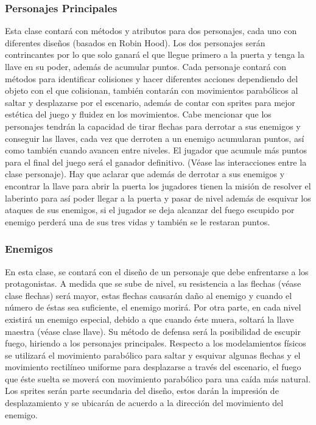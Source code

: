 \documentclass{article}
\begin{document}
\subsubsection{Personajes Principales}

Esta clase contará con métodos y atributos para dos personajes, cada uno con diferentes diseños (basados en Robin Hood). Los dos personajes serán contrincantes por lo que solo ganará el que llegue primero a la puerta y tenga la llave en su poder, además de acumular puntos. Cada personaje contará con métodos para identificar colisiones y hacer diferentes acciones dependiendo del objeto con el que colisionan, también contarán con movimientos parabólicos al saltar y desplazarse por el escenario, además de contar con sprites para mejor estética del juego y fluidez en los movimientos. Cabe mencionar que los personajes tendrán la capacidad de tirar flechas para derrotar a sus enemigos y conseguir las llaves, cada vez que derroten a un enemigo acumularan puntos, así como también cuando avancen entre niveles. El jugador que acumule más puntos para el final del juego será el ganador definitivo. (Véase las interacciones entre la clase personaje). Hay que aclarar que además de derrotar a sus enemigos y encontrar la llave para abrir la puerta los jugadores tienen la misión de resolver el laberinto para así poder llegar a la puerta y pasar de nivel además de esquivar los ataques de sus enemigos, si el jugador se deja alcanzar del fuego escupido por enemigo perderá una de sus tres vidas y también se le restaran puntos.

\subsubsection{Enemigos}

 En esta clase, se contará con el diseño de un personaje que debe enfrentarse a los protagonistas. A medida que se sube de nivel, su resistencia a las flechas (véase clase flechas) será mayor, estas flechas causarán daño al enemigo y cuando el número de éstas sea suficiente, el enemigo morirá. Por otra parte, en cada nivel existirá un enemigo especial, debido a que cuando éste muera, soltará la llave maestra (véase clase llave). Su método de defensa será la posibilidad de escupir fuego, hiriendo a los personajes principales. Respecto a los modelamientos físicos se utilizará el movimiento parabólico para saltar y esquivar algunas flechas y el movimiento rectilíneo uniforme para desplazarse a través del escenario, el fuego que éste suelta se moverá con movimiento parabólico para una caída más natural. Los sprites serán parte secundaria del diseño, estos darán la impresión de desplazamiento y se ubicarán de acuerdo a la dirección del movimiento del enemigo.
\end{document}
